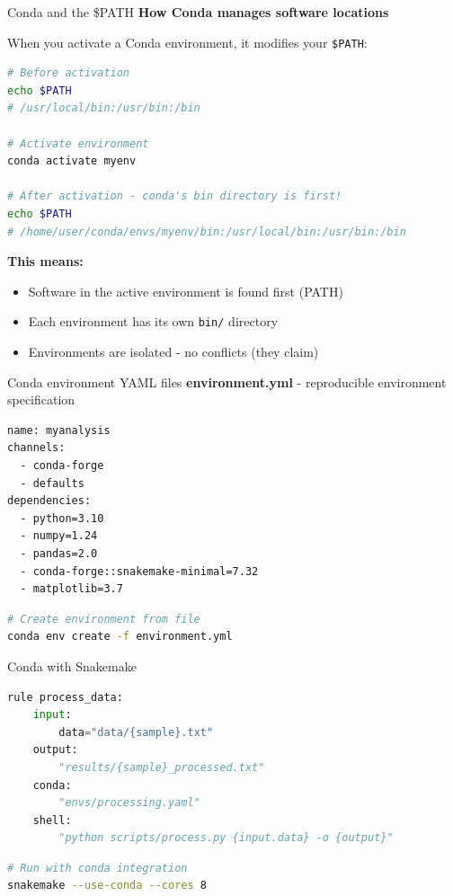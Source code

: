 \documentclass[aspectratio=169]{beamer}
\begin{document}
\begin{frame}[fragile]{Conda and the \$PATH}
    \textbf{How Conda manages software locations}
    
    When you activate a Conda environment, it modifies your \texttt{\$PATH}:
    
    \begin{lstlisting}[language=bash]
# Before activation
echo $PATH
# /usr/local/bin:/usr/bin:/bin

# Activate environment
conda activate myenv

# After activation - conda's bin directory is first!
echo $PATH
# /home/user/conda/envs/myenv/bin:/usr/local/bin:/usr/bin:/bin
\end{lstlisting}
    
    \vspace{0.3cm}
    \textbf{This means:}
    \begin{itemize}
        \item Software in the active environment is found first (PATH)
        \item Each environment has its own \texttt{bin/} directory
        \item Environments are isolated - no conflicts (they claim)
    \end{itemize}
\end{frame}

\begin{frame}[fragile]{Conda environment YAML files}
    \textbf{environment.yml} - reproducible environment specification
    
    \begin{lstlisting}
name: myanalysis
channels:
  - conda-forge
  - defaults
dependencies:
  - python=3.10
  - numpy=1.24
  - pandas=2.0
  - conda-forge::snakemake-minimal=7.32
  - matplotlib=3.7
\end{lstlisting}
    
    \begin{lstlisting}[language=bash]
# Create environment from file
conda env create -f environment.yml
\end{lstlisting}
\end{frame}

\begin{frame}[fragile]{Conda with Snakemake}
    \begin{lstlisting}[language=Python]
rule process_data:
    input:
        data="data/{sample}.txt"
    output:
        "results/{sample}_processed.txt"
    conda:
        "envs/processing.yaml"
    shell:
        "python scripts/process.py {input.data} -o {output}"
\end{lstlisting}
    
    \begin{lstlisting}[language=bash]
# Run with conda integration
snakemake --use-conda --cores 8
\end{lstlisting}
\end{frame}
\end{document}
